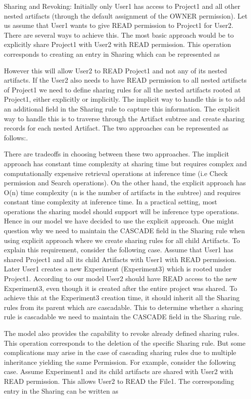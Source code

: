 \documentclass[sigconf]{acmart}
\begin{document}
Sharing and Revoking: Initially only User1 has access to Project1 and all other nested artifacts (through the default assignment of the OWNER permission). Let us assume that User1 wants to give READ permission to Project1 for User2.  There are several ways to achieve this. The most basic approach would be to explicitly share Project1 with User2 with READ permission. This operation corresponds to creating an entry in Sharing which can be represented as 

However this will allow User2 to READ Project1 and not any of its nested artifacts. If the User2 also needs to have READ permission to all nested artifacts of Project1 we need to define sharing rules for all the nested artifacts rooted at Project1, either explicitly or implicitly. The implicit way to handle this is to add an additional field in the Sharing rule to capture this information. The explicit way to handle this is to traverse through the Artifact subtree and create sharing records for each nested Artifact. The two approaches can be represented as follows:.

There are tradeoffs in choosing between these two approaches. The implicit approach has constant time complexity at sharing time but requires complex and computationally expensive retrieval operations at inference time (i.e Check permission and Search operations). On the other hand, the explicit approach has O(n) time complexity (n is the number of artifacts in the subtree) and requires constant time complexity at inference time. In a practical setting, most operations the sharing model should support will be inference type operations. Hence in our model we have decided to use the explicit approach.
One might question why we need to maintain the CASCADE field in the Sharing rule when using explicit approach where we create sharing rules for all child Artifacts. To explain this requirement, consider the following case. Assume that User1 has shared Project1 and all its child Artifacts with User1 with READ permission. Later User1 creates a new Experiment (Experiment3) which is rooted under Project1. According to our model User2 should have READ access to the new Experiment3, even though it is created after the entire project was shared. To achieve this at the Experiment3 creation time, it should inherit all the Sharing rules from its parent which are cascadable. This to determine whether a sharing rule is cascadable we need to maintain the CASCADE field in the Sharing rule.

The model also provides the capability to revoke already defined sharing rules. This operation corresponds to the deletion of the specific Sharing rule. But some complications may arise in the case of cascading sharing rules due to multiple inheritance yielding the same Permission. For example, consider the following case. Assume Experiment1 and its child artifacts are shared with User2 with READ permission. This allows User2 to READ the File1. The corresponding entry in the Sharing can be written as
\end{document}
